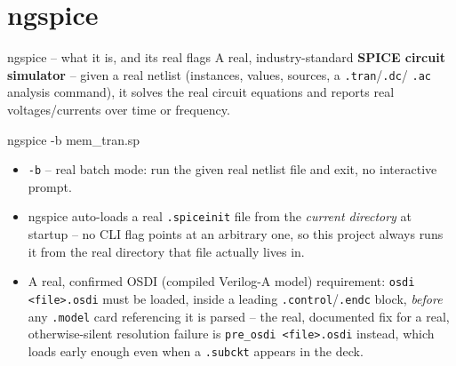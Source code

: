 \documentclass[aspectratio=169]{beamer}
\begin{document}
\section{ngspice}
\begin{frame}[fragile]{ngspice -- what it is, and its real flags}
A real, industry-standard \textbf{SPICE circuit simulator} -- given a
real netlist (instances, values, sources, a \texttt{.tran}/\texttt{.dc}/
\texttt{.ac} analysis command), it solves the real circuit equations
and reports real voltages/currents over time or frequency.
\begin{cli}
ngspice -b mem_tran.sp
\end{cli}
\begin{itemize}
  \item \texttt{-b} -- real batch mode: run the given real netlist
        file and exit, no interactive prompt.
  \item ngspice auto-loads a real \texttt{.spiceinit} file from the
        \emph{current directory} at startup -- no CLI flag points at
        an arbitrary one, so this project always runs it from the
        real directory that file actually lives in.
  \item A real, confirmed OSDI (compiled Verilog-A model) requirement:
        \texttt{osdi <file>.osdi} must be loaded, inside a leading
        \texttt{.control}/\texttt{.endc} block, \emph{before} any
        \texttt{.model} card referencing it is parsed -- the real,
        documented fix for a real, otherwise-silent resolution
        failure is \texttt{pre\_osdi <file>.osdi} instead, which loads
        early enough even when a \texttt{.subckt} appears in the deck.
\end{itemize}
\end{frame}

\end{document}
